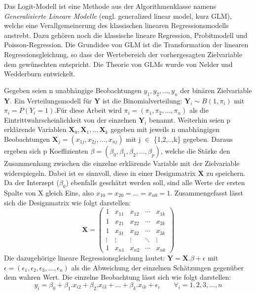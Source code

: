\documentclass[12pt,]{article}
\begin{document}
Das Logit-Modell ist eine Methode aus der Algorithmenklasse namens
\emph{Generalisierte Lineare Modelle} (engl. generalized linear model,
kurz GLM), welche eine Verallgemeinerung des klassischen linearen
Regressionsmodells anstrebt. Dazu gehören noch die klassische lineare
Regression, Probitmodell und Poisson-Regression. Die Grundidee von GLM
ist die Transformation der linearen Regressionsgleichung, so dass der
Wertebereich der vorhergesagten Zielvariable dem gewünschten entspricht.
Die Theorie von GLMs wurde von Nelder und Wedderburn entwickelt.

Gegeben seien n unabhängige Beobachtungen \(y_1, y_2, ...,y_n\) der
binären Zielvariable \(\mathbf{Y}\). Ein Verteilungsmodell für
\(\mathbf{Y}\) ist die Binomialverteilung:
\(\mathbf{Y}_i \sim B(1, \pi_i)\) mit \(\pi_i = P(Y_i = 1)\).Für diese
Arbeit wird \(\pi_i = (\pi_1, \pi_2, ..., \pi_n)\) als die
Eintrittwahrscheinlichkeit von der einzelnen \(\mathbf{Y}_i\) benannt.
Weiterhin seien p erklärende Variablen
\(\mathbf{X}_0,\mathbf{X}_1,..,\mathbf{X}_k\) gegeben mit jeweils n
unabhängigen Beobachtungen
\(\mathbf{X}_j = (x_{1j}, x_{2j},..., x_{nj})\) mit j \(\in\)
\{1,2,..,k\} gegeben. Daraus ergeben sich p Koeffizienten
\(\beta = (\beta_0, \beta_1, \beta_2,..., \beta_p)\), welche die Stärke
den Zusammenhang zwischen die einzelne erklärende Variable mit der
Zielvariable widerspiegeln. Dabei ist es sinnvoll, diese in einer
Designmatrix \(\mathbf{X}\) zu speichern. Da der Interzept (\(\beta_0\))
ebenfalls geschätzt werden soll, sind alle Werte der ersten Spalte von X
gleich Eins, also \(x_{10} = x_{20} = ... = x_{n0} = 1\).
Zusammengefasst lässt sich die Designmatrix wie folgt darstellen: \[
\mathbf{X} =
 \begin{pmatrix}
    1 & x_{11} & x_{12} & \cdots & x_{1k} \\
    1 & x_{21} & x_{22} & \cdots & x_{2k} \\
    1 & x_{31} & x_{32} & \cdots & x_{3k} \\
    \vdots  & \vdots  & \vdots & \ddots & \vdots \\
    1 & x_{n1} & x_{n2} & \cdots & x_{nk}
 \end{pmatrix}
\] Die dazugehörige lineare Regressionsgleichung lautet:
\(\mathbf{Y} = \mathbf{X}.\beta + \epsilon\) mit
\(\epsilon = (\epsilon_1, \epsilon_2, \epsilon_3, ..., \epsilon_n)\) als
die Abweichung der einzelnen Schätzungen gegenüber dem wahren Wert. Die
einzelne Beobachtung lässt sich wie folgt darstellen:
\[y_i = \beta_0 + \beta_1.x_{i2} + \beta_2.x_{i3} + ... + \beta_k.x_{ik} + \epsilon_i \qquad \forall_i = 1,2,3,...,n\]
\end{document}
